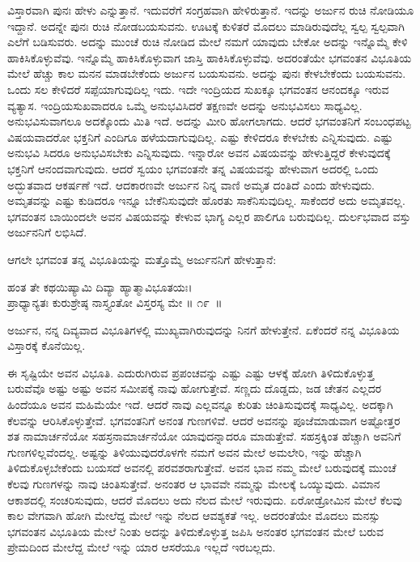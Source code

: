 ವಿಸ್ತಾರವಾಗಿ ಪುನಃ ಹೇಳು ಎನ್ನುತ್ತಾನೆ. ಇದುವರೆಗೆ ಸಂಗ್ರಹವಾಗಿ ಹೇಳಿರುತ್ತಾನೆ. ಇದನ್ನು ಅರ್ಜುನ ರುಚಿ ನೋಡಿಯೂ ಇದ್ದಾನೆ. ಅದನ್ನೇ ಪುನಃ ರುಚಿ ನೋಡಬಯಸುವನು. ಊಟಕ್ಕೆ ಕುಳಿತರೆ ಮೊದಲು ಮಾಡಿರುವುದೆಲ್ಲ ಸ್ವಲ್ಪ ಸ್ವಲ್ಪವಾಗಿ ಎಲೆಗೆ ಬಡಿಸುವರು. ಅದನ್ನು ಮುಂಚೆ ರುಚಿ ನೋಡಿದ ಮೇಲೆ ನಮಗೆ ಯಾವುದು ಬೇಕೋ ಅದನ್ನು ಇನ್ನೊಮ್ಮೆ ಕೇಳಿ ಹಾಕಿಸಿಕೊಳ್ಳುವೆವು. ಇನ್ನೊಮ್ಮೆ ಹಾಕಿಸಿಕೊಳ್ಳುವಾಗ ಜಾಸ್ತಿ ಹಾಕಿಸಿಕೊಳ್ಳುವೆವು. ಅದರಂತೆಯೇ ಭಗವಂತನ ವಿಭೂತಿಯ ಮೇಲೆ ಹೆಚ್ಚು ಕಾಲ ಮನನ ಮಾಡಬೇಕೆಂದು ಅರ್ಜುನ ಬಯಸುವನು. ಅದನ್ನು ಪುನಃ ಕೇಳಬೇಕೆಂದು ಬಯಸುವನು. ಒಂದು ಸಲ ಕೇಳಿದರೆ ಸಪ್ಪೆಯಾಗುವುದಿಲ್ಲ ಇದು. ಇದೇ ಇಂದ್ರಿಯದ ಸುಖಕ್ಕೂ ಭಗವಂತನ ಆನಂದಕ್ಕೂ ಇರುವ ವ್ಯತ್ಯಾಸ. ಇಂದ್ರಿಯಸುಖವಾದರೂ ಒಮ್ಮೆ ಅನುಭವಿಸಿದರೆ ತಕ್ಷಣವೇ ಅದನ್ನು ಅನುಭವಿಸಲು ಸಾಧ್ಯವಿಲ್ಲ. ಅನುಭವಿಸುವಾಗಲೂ ಅದಕ್ಕೊಂದು ಮಿತಿ ಇದೆ. ಅದನ್ನು ಮೀರಿ ಹೋಗಲಾಗದು. ಆದರೆ ಭಗವಂತನಿಗೆ ಸಂಬಂಧಪಟ್ಟ ವಿಷಯವಾದರೋ ಭಕ್ತನಿಗೆ ಎಂದಿಗೂ ಹಳೆಯದಾಗುವುದಿಲ್ಲ. ಎಷ್ಟು ಕೇಳಿದರೂ ಕೇಳಬೇಕು ಎನ್ನಿಸುವುದು. ಎಷ್ಟು ಅನುಭವಿ ಸಿದರೂ ಅನುಭವಿಸಬೇಕು ಎನ್ನಿಸುವುದು. ಇನ್ನಾರೋ ಅವನ ವಿಷಯವನ್ನು ಹೇಳುತ್ತಿದ್ದರೆ ಕೇಳುವುದಕ್ಕೆ ಭಕ್ತನಿಗೆ ಆನಂದವಾಗುವುದು. ಆದರೆ ಸ್ವಯಂ ಭಗವಂತನೇ ತನ್ನ ವಿಷಯವನ್ನು ಹೇಳುವಾಗ ಅದರಲ್ಲಿ ಒಂದು ಅದ್ಭುತವಾದ ಆಕರ್ಷಣೆ ಇದೆ. ಆದಕಾರಣವೇ ಅರ್ಜುನ ನಿನ್ನ ವಾಣಿ ಅಮೃತ ದಂತಿದೆ ಎಂದು ಹೇಳುವುದು. ಅಮೃತವನ್ನು ಎಷ್ಟು ಕುಡಿದರೂ ಇನ್ನೂ ಬೇಕೆನಿಸುವುದೇ ಹೊರತು ಸಾಕೆನಿಸುವುದಿಲ್ಲ. ಸಾಕೆಂದರೆ ಅದು ಅಮೃತವಲ್ಲ. ಭಗವಂತನ ಬಾಯಿಂದಲೇ ಅವನ ವಿಷಯವನ್ನು ಕೇಳುವ ಭಾಗ್ಯ ಎಲ್ಲರ ಪಾಲಿಗೂ ಬರುವುದಿಲ್ಲ. ದುರ್ಲಭವಾದ ವಸ್ತು ಅರ್ಜುನನಿಗೆ ಲಭಿಸಿದೆ.

ಆಗಲೇ ಭಗವಂತ ತನ್ನ ವಿಭೂತಿಯನ್ನು ಮತ್ತೊಮ್ಮೆ ಅರ್ಜುನನಿಗೆ ಹೇಳುತ್ತಾನೆ:

\begin{shloka}
ಹಂತ ತೇ ಕಥಯಿಷ್ಯಾಮಿ ದಿವ್ಯಾ ಹ್ಯಾತ್ಮಾವಿಭೂತಯಃ।\\ಪ್ರಾಧ್ಯಾನ್ಯತಃ ಕುರುಶ್ರೇಷ್ಠ ನಾಸ್ತ್ಯಂತೋ ವಿಸ್ತರಸ್ಯ ಮೇ \hfill॥ ೧೯~॥
\end{shloka}

\begin{artha}
ಅರ್ಜುನ, ನನ್ನ ದಿವ್ಯವಾದ ವಿಭೂತಿಗಳಲ್ಲಿ ಮುಖ್ಯವಾಗಿರುವುದನ್ನು ನಿನಗೆ ಹೇಳುತ್ತೇನೆ. ಏಕೆಂದರೆ ನನ್ನ ವಿಭೂತಿಯ ವಿಸ್ತಾರಕ್ಕೆ ಕೊನೆಯಿಲ್ಲ.
\end{artha}

ಈ ಸೃಷ್ಟಿಯೇ ಅವನ ವಿಭೂತಿ. ಎದುರುಗಿರುವ ಪ್ರಪಂಚವನ್ನು ಎಷ್ಟು ಎಷ್ಟು ಆಳಕ್ಕೆ ಹೋಗಿ ತಿಳಿದುಕೊಳ್ಳುತ್ತ ಬರುವೆವೊ ಅಷ್ಟು ಅಷ್ಟು ಅವನ ಸಮೀಪಕ್ಕೆ ನಾವು ಹೋಗುತ್ತೇವೆ. ಸಣ್ಣದು ದೊಡ್ಡದು, ಜಡ ಚೇತನ ಎಲ್ಲದರ ಹಿಂದೆಯೂ ಅವನ ಮಹಿಮೆಯೇ ಇದೆ. ಆದರೆ ನಾವು ಎಲ್ಲವನ್ನೂ ಕುರಿತು ಚಿಂತಿಸುವುದಕ್ಕೆ ಸಾಧ್ಯವಿಲ್ಲ. ಅದಕ್ಕಾಗಿ ಕೆಲವನ್ನು ಆರಿಸಿಕೊಳ್ಳುತ್ತೇವೆ. ಭಗವಂತನಿಗೆ ಅನಂತ ಗುಣಗಳಿವೆ. ಆದರೆ ಅವನನ್ನು ಪೂಜೆಮಾಡುವಾಗ ಅಷ್ಟೋತ್ತರ ಶತ ನಾಮಾರ್ಚನೆಯೋ ಸಹಸ್ರನಾಮಾರ್ಚನೆಯೋ ಯಾವುದನ್ನಾದರೂ ಮಾಡುತ್ತೇವೆ. ಸಹಸ್ರಕ್ಕಿಂತ ಹೆಚ್ಚಾಗಿ ಅವನಿಗೆ ಗುಣಗಳಿಲ್ಲವೆಂದಲ್ಲ. ಅಷ್ಟನ್ನು ತಿಳಿಯುವುದರೊಳಗೇ ನಮಗೆ ಅವನ ಮೇಲೆ ಅಮಲೇರಿ, ಇನ್ನು ಹೆಚ್ಚಾಗಿ ತಿಳಿದುಕೊಳ್ಳಬೇಕೆಂದು ಬಯಸದೆ ಅವನಲ್ಲಿ ಪರವಶರಾಗುತ್ತೇವೆ. ಅವನ ಭಾವ ನಮ್ಮ ಮೇಲೆ ಬರುವುದಕ್ಕೆ ಮುಂಚೆ ಕೆಲವು ಗುಣಗಳನ್ನು ನಾವು ಚಿಂತಿಸುತ್ತೇವೆ. ಅನಂತರ ಆ ಭಾವವೇ ನಮ್ಮನ್ನು ಮೇಲಕ್ಕೆ ಒಯ್ಯುವುದು. ವಿಮಾನ ಆಕಾಶದಲ್ಲಿ ಸಂಚರಿಸುವುದು, ಆದರೆ ಮೊದಲು ಅದು ನೆಲದ ಮೇಲೆ ಇರುವುದು. ಏರೋಡ್ರೋಮಿನ ಮೇಲೆ ಕೆಲವು ಕಾಲ ವೇಗವಾಗಿ ಹೋಗಿ ಮೇಲೆದ್ದ ಮೇಲೆ ಇನ್ನು ನೆಲದ ಆವಶ್ಯಕತೆ ಇಲ್ಲ. ಅದರಂತೆಯೇ ಮೊದಲು ಮನಸ್ಸು ಭಗವಂತನ ವಿಭೂತಿಯ ಮೇಲೆ ನಿಂತು ಅದನ್ನು ತಿಳಿದುಕೊಳ್ಳುತ್ತ ಜಪಿಸಿ ಅನಂತರ ಭಗವಂತನ ಮೇಲೆ ಬರುವ ಪ್ರೇಮದಿಂದ ಮೇಲೆದ್ದ ಮೇಲೆ ಇನ್ನು ಯಾರ ಆಸರೆಯೂ ಇಲ್ಲದೆ ಇರಬಲ್ಲದು.

